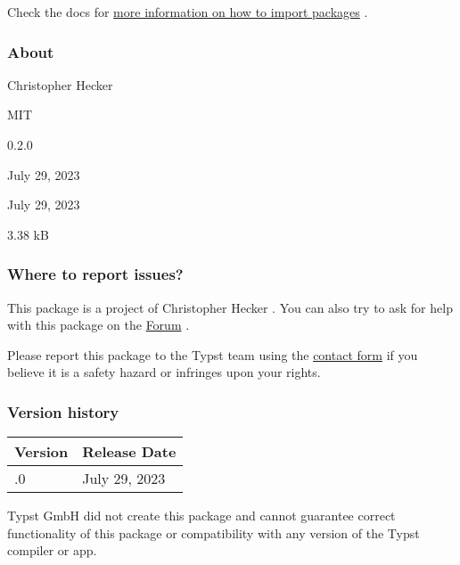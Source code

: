 

Check the docs for
\href{https://typst.app/docs/reference/scripting/\#packages}{more
information on how to import packages} .

\subsubsection{About}\label{about}

\begin{description}
\tightlist
\item[Author :]
Christopher Hecker
\item[License:]
MIT
\item[Current version:]
0.2.0
\item[Last updated:]
July 29, 2023
\item[First released:]
July 29, 2023
\item[Archive size:]
3.38 kB
\href{https://packages.typst.org/preview/diverential-0.2.0.tar.gz}{\pandocbounded{}}
\end{description}

\subsubsection{Where to report issues?}\label{where-to-report-issues}

This package is a project of Christopher Hecker . You can also try to
ask for help with this package on the
\href{https://forum.typst.app}{Forum} .

Please report this package to the Typst team using the
\href{https://typst.app/contact}{contact form} if you believe it is a
safety hazard or infringes upon your rights.

\label{versions}
\subsubsection{Version history}\label{version-history}

\begin{longtable}[]{@{}ll@{}}
\toprule\noalign{}
Version & Release Date \\
\midrule\noalign{}
\endhead
\bottomrule\noalign{}
\endlastfoot
0.2.0 & July 29, 2023 \\
\end{longtable}

Typst GmbH did not create this package and cannot guarantee correct
functionality of this package or compatibility with any version of the
Typst compiler or app.

